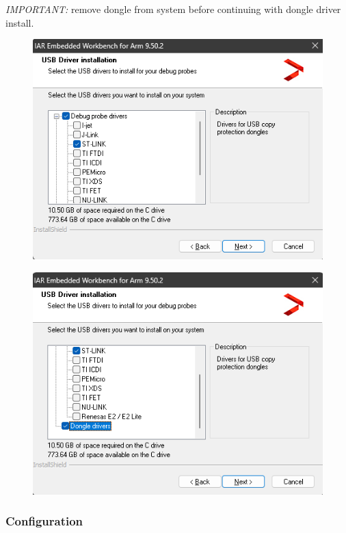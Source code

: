 \documentclass[10pt]{article}
\begin{document}
                \emph{IMPORTANT:} remove dongle from system before continuing with dongle driver install.
                \begin{figure}[H]
                    \centerline{\includegraphics[width=\textwidth]{References/Debug probe drivers.png}}
                \end{figure}
                \begin{figure}[H]
                    \centerline{\includegraphics[width=\textwidth]{References/Dongle drivers.png}}
                \end{figure}
			\FloatBarrier \subsubsection{Configuration}
\end{document}
